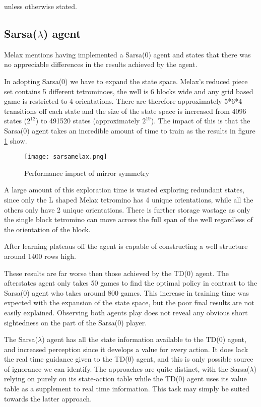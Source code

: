 \documentclass{rucsthesis}
\begin{document}
unless otherwise stated.

\subsection{Sarsa($\lambda$) agent}

Melax mentions having implemented a Sarsa(0) agent and states that there was no appreciable differences in the results achieved by the agent. 

In adopting Sarsa(0) we have to expand the state space. Melax's reduced piece set contains 5 different tetrominoes, the well is 6 blocks wide and any grid based game is restricted to 4 orientations. There are therefore approximately 5*6*4 transitions off each state and the size of the state space is increased from 4096 states ($2^{12}$) to 491520 states (approximately $2^{19}$). The impact of this is that the Sarsa(0) agent takes an incredible amount of time to train as the results in figure \ref{fig:melaxsarsa} show.

\begin{figure}[h]
\centering
\texttt{[image: sarsamelax.png]}
\caption{Performance impact of mirror symmetry}
\label{fig:melaxsarsa}
\end{figure} 

A large amount of this exploration time is wasted exploring redundant states, since only the L shaped Melax tetromino has 4 unique orientations, while all the others only have 2 unique orientations. There is further storage wastage as only the single block tetromino can move across the full span of the well regardless of the orientation of the block. 

After learning plateaus off the agent is capable of constructing a well structure around 1400 rows high. 

These results are far worse then those achieved by the TD(0) agent. The afterstates agent only takes 50 games to find the optimal policy in contrast to the Sarsa(0) agent who takes around 800 games. This increase in training time was expected with the expansion of the state space, but the poor final results are not easily explained. Observing both agents play does not reveal any obvious short sightedness on the part of the Sarsa(0) player.

The Sarsa($\lambda$) agent has all the state information available to the TD(0) agent, and increased perception since it develops a value for every action. It does lack the real time guidance given to the TD(0) agent, and this is only possible source of ignorance we can identify. The approaches are quite distinct, with the Sarsa($\lambda$) relying on purely on its state-action table while the TD(0) agent uses its value table as a supplement to real time information. This task may simply be suited towards the latter approach.
\end{document}
